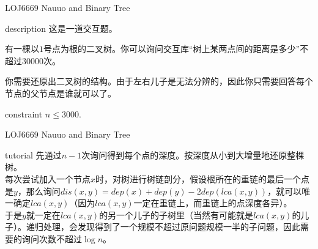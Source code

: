 \documentclass{beamer}
\begin{document}
\begin{frame}{LOJ6669 Nauuo and Binary Tree}
	\begin{block}{description}
		这是一道交互题。
		
		有一棵以$1$号点为根的二叉树。你可以询问交互库“树上某两点间的距离是多少”不超过$30000$次。
		
		你需要还原出二叉树的结构。由于左右儿子是无法分辨的，因此你只需要回答每个节点的父节点是谁就可以了。
	\end{block}
	\begin{block}{constraint}
		$n \le 3000.$
	\end{block}
\end{frame}
\begin{frame}{LOJ6669 Nauuo and Binary Tree}
	\begin{block}{tutorial}
		先通过$n-1$次询问得到每个点的深度。按深度从小到大增量地还原整棵树。\\
		
		每次尝试加入一个节点$x$时，对树进行树链剖分，假设根所在的重链的最后一个点是$y$，那么询问$dis(x, y) = dep(x) + dep(y) - 2dep(lca(x, y))$，就可以唯一确定$lca(x, y)$（因为$lca(x, y)$一定在重链上，而重链上的点深度各异）。\\
		
		于是$y$就一定在$lca(x, y)$的另一个儿子的子树里（当然有可能就是$lca(x, y)$的儿子）。递归处理，会发现得到了一个规模不超过原问题规模一半的子问题，因此需要的询问次数不超过$\log n$。
	\end{block}
\end{frame}
\end{document}
